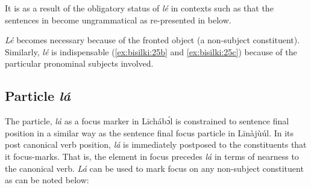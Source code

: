\documentclass[output=paper,colorlinks,citecolor=brown]{langscibook}
\begin{document}
It is as a result of the obligatory status of \textit{lé} in contexts such as  that the sentences in  become ungrammatical as re-presented in  below.

\ea%
    \label{ex:bisilki:25}
    \z
\z

\textit{Lé}  becomes necessary because of the fronted object (a non-subject constituent). Similarly, \textit{lé} is indispensable (\ref{ex:bisilki:25b} and \ref{ex:bisilki:25c}) because of the particular pronominal subjects involved.

\subsection{Particle \textit{lá}}\label{sec:bisilki:7.2}

The particle, \textit{lá} as a focus marker in Līcháb\'{ɔ}l is constrained to sentence final position in a similar way as the sentence final focus particle in Līnàjùúl. In its post canonical verb position, \textit{lá} is immediately postposed to the constituents that it focus-marks. That is, the element in focus precedes \textit{lá} in terms of nearness to the canonical verb. \textit{Lá} can be used to mark focus on any non-subject constituent as can be noted  below:
\end{document}
